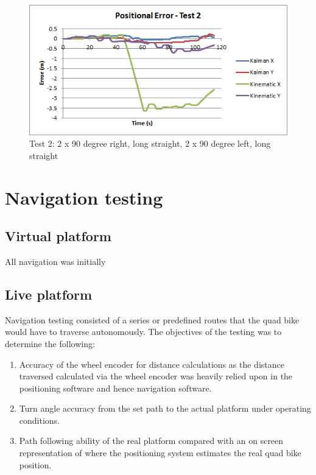 \documentclass[main.tex]{subfiles}
\begin{document}
\begin{figure}[ht]
\includegraphics[width=\textwidth]{5-Testing/position_error_test_2.png}
\centering
\caption[Positioning system test 2]{Test 2: 2 x 90 degree right, long straight, 2 x 90 degree left, long straight} 
\end{figure}

\section{Navigation testing}
\subsection{Virtual platform}
All navigation was initially 

\subsection{Live platform}
Navigation testing consisted of a series or predefined routes that the quad bike would have to traverse autonomously. The objectives of the testing was to determine the following:

\begin{enumerate}
\item Accuracy of the wheel encoder for distance calculations as the distance traversed calculated via the wheel encoder was heavily relied upon in the positioning software and hence navigation software.
\item Turn angle accuracy from the set path to the actual platform under operating conditions. 
\item Path following ability of the real platform compared with an on screen representation of where the positioning system estimates the real quad bike position.
\end{enumerate}
\end{document}
